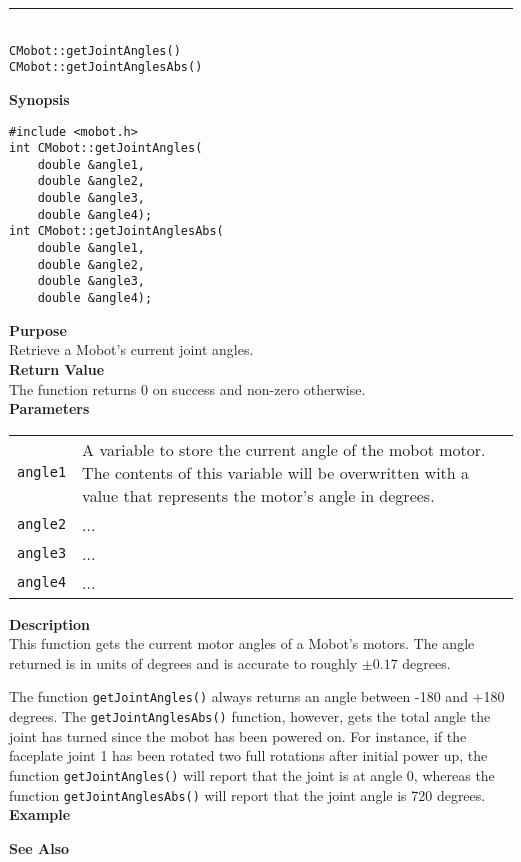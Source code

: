 \noindent
\vspace{5pt}
\rule{4.5in}{0.015in}\\
\noindent
{\LARGE \texttt{CMobot::getJointAngles()}}\\
{\LARGE \texttt{CMobot::getJointAnglesAbs()}}\\
{}

\noindent
{\bf Synopsis}
\vspace{-8pt}
\begin{verbatim}
#include <mobot.h>
int CMobot::getJointAngles(
    double &angle1,
    double &angle2,
    double &angle3,
    double &angle4);
int CMobot::getJointAnglesAbs(
    double &angle1,
    double &angle2,
    double &angle3,
    double &angle4);
\end{verbatim}

\noindent
{\bf Purpose}\\
Retrieve a Mobot's current joint angles.\\

\noindent
{\bf Return Value}\\
The function returns 0 on success and non-zero otherwise.\\

\noindent
{\bf Parameters}\\
\vspace{-0.1in}
\begin{description}
\item               
\begin{tabular}{p{15 mm}p{145 mm}}
\texttt{angle1} & A variable to store the current angle of the mobot
motor. The contents of this variable will be overwritten with a value that
represents the motor's angle in degrees.  \\
\texttt{angle2} & ...  \\
\texttt{angle3} & ...  \\
\texttt{angle4} & ...  \\
\end{tabular}
\end{description}

\noindent
{\bf Description}\\
This function gets the current motor angles of a Mobot's motors. The
angle returned is in units of degrees and is accurate to roughly $\pm0.17$
degrees. 

The function \texttt{getJointAngles()} always returns an angle between -180 and
+180 degrees. The \texttt{getJointAnglesAbs()} function, however, gets the total
angle the joint has turned since the mobot has been powered on. For instance, 
if the faceplate joint 1 has been rotated two full rotations after initial power up,
  the function \texttt{getJointAngles()} will report that the joint is at angle 0,
  whereas the function \texttt{getJointAnglesAbs()} will report that the joint
  angle is 720 degrees.
\\

\noindent
{\bf Example}\\
\noindent

\noindent
{\bf See Also}\\

